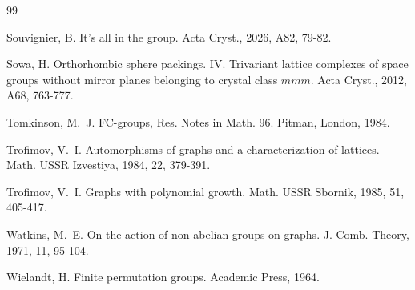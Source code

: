 \documentclass[11pt,a4paper]{article}
\begin{document}
\begin{thebibliography}{99}
\begin{small}
 Souvignier, B. It's all in the group. Acta Cryst., 2026, A82, 79-82. 

 Sowa, H. Orthorhombic sphere packings. IV. Trivariant lattice complexes of space groups without mirror  planes belonging to crystal class $mmm$.  Acta Cryst., 2012, A68, 763-777.

 Tomkinson, M.~J. FC-groups, Res. Notes in Math. 96. Pitman, London, 1984.

 Trofimov, V.~I. Automorphisms of graphs and a characterization of lattices. Math. USSR Izvestiya, 1984, 22, 379-391. %

 Trofimov, V.~I. Graphs with polynomial growth. Math. USSR Sbornik, 1985, 51, 405-417. %

 Watkins, M.~E. On the action of non-abelian groups on graphs. J. Comb. Theory, 1971, 11, 95-104.

 Wielandt, H. Finite permutation groups. Academic Press, 1964.

\end{small}

\end{thebibliography}
\end{document}

